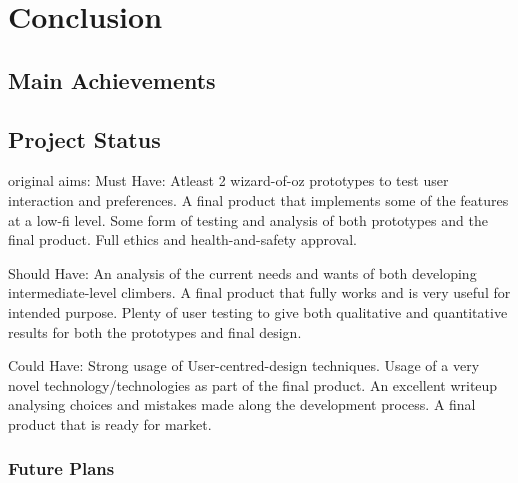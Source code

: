 \chapter{Conclusion}
\label{chap:conclusion}


\section{Main Achievements}







\section{Project Status}



original aims:
Must Have: Atleast 2 wizard-of-oz prototypes to test user interaction and preferences.
A final product that implements some of the features at a low-fi level. Some form of testing and analysis of both prototypes and the final product.
Full ethics and health-and-safety approval.


Should Have:
An analysis of the current needs and wants of both developing intermediate-level climbers.
A final product that fully works and is very useful for intended purpose.
Plenty of user testing to give both qualitative and quantitative results for both the prototypes and final design.

Could Have: Strong usage of User-centred-design techniques.
Usage of a very novel technology/technologies as part of the final product.
An excellent writeup analysing choices and mistakes made along the development process.
A final product that is ready for market.







\subsection{Future Plans}


